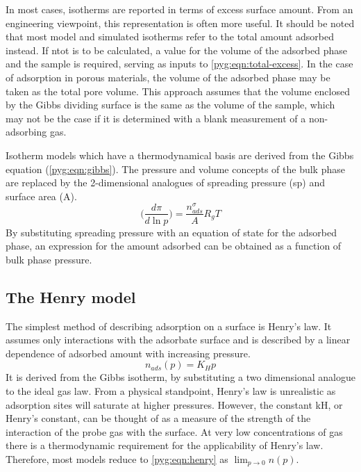 In most cases, isotherms are reported in terms of excess surface 
amount. From an engineering viewpoint, this representation
is often more useful. It should be noted that most model and simulated
isotherms refer to the total amount adsorbed instead.
If \gls{ntot} is to be calculated, a value
for the volume of the adsorbed phase and the sample is required, 
serving as inputs to \autoref{pyg:eqn:total-excess}.
In the case of adsorption in porous materials, the volume of the
adsorbed phase may be taken as the total pore volume. This approach
assumes that the volume enclosed by the Gibbs dividing surface is
the same as the volume of the sample, which may not be the case 
if it is determined with a blank measurement of a 
non-adsorbing gas.

Isotherm models which have a thermodynamical basis are derived
from the Gibbs equation (\autoref{pyg:eqn:gibbs}). 
The pressure and volume concepts of the bulk phase
are replaced by the 2-dimensional analogues of spreading pressure 
(\gls{sp}) and surface area (\gls{A}).
%
\begin{equation}\label{pyg:eqn:gibbs}
	\Big(\frac{d\pi}{d\ln{p}}\Big) = \frac{n_{ads}^{\sigma}}{A} R_g T
\end{equation}
%
By substituting spreading pressure with an equation
of state for the adsorbed phase, an expression for the amount
adsorbed can be obtained as a function of bulk phase pressure.

\subsection{The Henry model}\label{pyg:models:henry}

The simplest method of describing adsorption on a
surface is Henry’s law. It assumes only interactions
with the adsorbate surface and is described by a
linear dependence of adsorbed amount with
increasing pressure.
%
\begin{equation}\label{pyg:eqn:henry}
	n_{ads}(p) = K_H p
\end{equation}
%
It is derived from the Gibbs isotherm, by substituting
a two dimensional analogue to the ideal gas law.
From a physical standpoint, Henry's law is unrealistic as adsorption sites
will saturate at higher pressures. However, the constant \gls{kH},
or Henry’s constant, can be thought of as a measure of the strength
of the interaction of the probe gas with the surface. At very
low concentrations of gas there is a
thermodynamic requirement for the applicability of Henry's law.
Therefore, most models reduce to \autoref{pyg:eqn:henry}
as \(\lim_{p \to 0} n(p)\).


